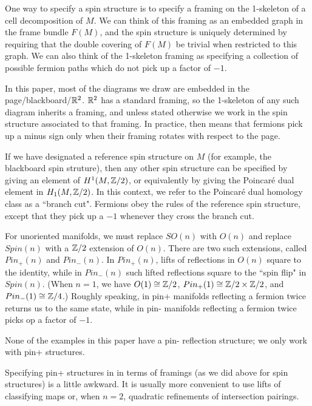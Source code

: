 One way to specify a spin structure is to specify a framing on the 1-skeleton of a cell decomposition of $M$.
We can think of this framing as an embedded graph in the frame bundle $F(M)$, and the spin structure is uniquely determined by requiring
that the double covering of $F(M)$ be trivial when restricted to this graph.
We can also think of the 1-skeleton framing as specifying a collection of possible fermion paths which do not pick up a factor of $-1$.

In this paper, most of the diagrams we draw are embedded in the page/blackboard/$\mathbb{R}^2$.
$\mathbb{R}^2$ has a standard framing, so the 1-skeleton of any such diagram inherits a framing, and unless stated otherwise we work in the spin
structure associated to that framing.
In practice, then means that fermions pick up a minus sign only when their framing rotates with respect to the page.

If we have designated a reference spin structure on $M$ (for example, the blackboard spin struture), 
then any other spin structure can be specified by giving an
element of $H^1(M, \mathbb{Z}/2)$, or equivalently by giving the Poincar\'e dual element in $H_1(M, \mathbb{Z}/2)$.
In this context, we refer to the Poincar\'e dual homology class as a ``branch cut".
Fermions obey the rules of the reference spin structure, except that they pick up a $-1$ whenever they cross the branch cut.

\medskip


\medskip

For unoriented manifolds, we must replace $SO(n)$ with $O(n)$ and replace $Spin(n)$ with a $\mathbb{Z}/2$ extension of $O(n)$.
There are two such extensions, called $Pin_+(n)$ and $Pin_-(n)$.
In $Pin_+(n)$, lifts of reflections in $O(n)$ square to the identity, while in $Pin_-(n)$ such lifted reflections square to the ``spin flip"
in $Spin(n)$.
(When $n=1$, we have $O(1)\cong\mathbb{Z}/2$, $Pin_+(1)\cong\mathbb{Z}/2\times\mathbb{Z}/2$, and $Pin_-(1)\cong\mathbb{Z}/4$.)
Roughly speaking, in pin+ manifolds reflecting a fermion twice returns us to the same state, while in pin- manifolds reflecting a fermion twice
picks op a factor of $-1$.

None of the examples in this paper have a pin- reflection structure; we only work with pin+ structures.

Specifying pin+ structures in in terms of framings (as we did above for spin structures) is a little awkward.
It is usually more convenient to use lifts of classifying maps or, when $n=2$, quadratic refinements of intersection pairings.

